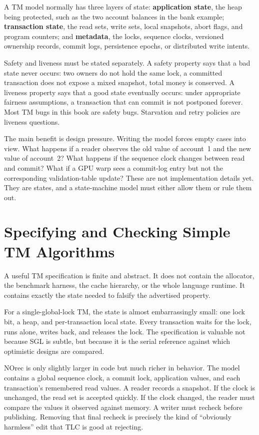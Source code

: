 A TM model normally has three layers of state: \textbf{application state}, the
heap being protected, such as the two account balances in the bank example;
\textbf{transaction state}, the read sets, write sets, local snapshots, abort
flags, and program counters; and \textbf{metadata}, the locks, sequence clocks,
versioned ownership records, commit logs, persistence epochs, or distributed
write intents.

Safety and liveness must be stated separately.  A safety property says that a
bad state never occurs: two owners do not hold the same lock, a committed
transaction does not expose a mixed snapshot, total money is conserved.  A
liveness property says that a good state eventually occurs: under appropriate
fairness assumptions, a transaction that can commit is not postponed forever.
Most TM bugs in this book are safety bugs.  Starvation and retry policies are
liveness questions.

The main benefit is design pressure.  Writing the model forces empty cases into
view.  What happens if a reader observes the old value of account~1 and the new
value of account~2?  What happens if the sequence clock changes between read and
commit?  What if a GPU warp sees a commit-log entry but not the corresponding
validation-table update?  These are not implementation details yet.  They are
states, and a state-machine model must either allow them or rule them out.

\section{Specifying and Checking Simple TM Algorithms}

A useful TM specification is finite and abstract.  It does not contain the
allocator, the benchmark harness, the cache hierarchy, or the whole language
runtime.  It contains exactly the state needed to falsify the advertised
property.

For a single-global-lock TM, the state is almost embarrassingly small: one lock
bit, a heap, and per-transaction local state.  Every transaction waits for the
lock, runs alone, writes back, and releases the lock.  The specification is
valuable not because SGL is subtle, but because it is the serial reference
against which optimistic designs are compared.

NOrec is only slightly larger in code but much richer in behavior.  The model
contains a global sequence clock, a commit lock, application values, and each
transaction's remembered read values.  A reader records a snapshot.  If the
clock is unchanged, the read set is accepted quickly.  If the clock changed, the
reader must compare the values it observed against memory.  A writer must
recheck before publishing.  Removing that final recheck is precisely the kind of
``obviously harmless'' edit that TLC is good at rejecting.


